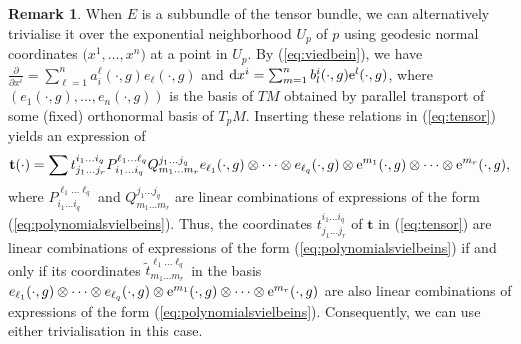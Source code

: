 \documentclass[pdftex]{sigma}
\numberwithin{equation}{section}
\theoremstyle{definition}
\newtheorem{rk}[thm]{Remark}
\begin{document}
\begin{rk} \label{lem:subbundlemetric}	When $E$ is a subbundle of the tensor bundle, we can alternatively trivialise it over the exponential neighborhood $U_p$ of $p$ using geodesic normal coordinates $\bigl(x^1, \dots, x^n\bigr)$ at a point in $U_p$.
By (\ref{eq:viedbein}), we have $\frac{ \partial}{\partial x^i}=\sum_{\ell=1}^n a_i^\ell (\cdot, g) e_\ell(\cdot,g)$ and ${\rm d}x^i=\sum_{m=1}^n b_l^i(\cdot, g) {\rm e}^l(\cdot,g) $, where $( e_1(\cdot, g), \dots, e_n(\cdot, g))$ is the basis of $TM$ obtained by parallel transport of some (fixed) orthonormal basis of $ T_pM$. Inserting these relations in
(\ref{eq:tensor}) yields an expression of
\[
\mathbf t(\cdot)=\sum t_{j_1\dots j_r}^{i_1 \dots i_q} P_{i_1\dots i_q }^{\ell_1\dots \ell_q} Q^{j_1\dots j_q }_{m_1\dots m_r} e_{\ell_1}(\cdot, g)\otimes\dots\otimes e_{\ell_q}(\cdot, g)\otimes {\rm e}^{m_1}(\cdot, g)\otimes \dots \otimes {\rm e}^{m_r}(\cdot, g),
\]
where $P_{i_1\dots i_q }^{\ell_1\dots \ell_q}$ and $Q^{j_1\dots j_q }_{m_1\dots m_r} $ are linear combinations of expressions of the form (\ref{eq:polynomialsvielbeins}). Thus, the coordinates $ t_{j_1\dots j_r}^{i_1 \dots i_q} $ of ${\mathbf t}$ in
(\ref{eq:tensor}) are linear combinations of expressions of the form (\ref{eq:polynomialsvielbeins}) if and only if its coordinates $ \tilde t_{m_1\dots m_r}^{\ell_1 \dots \ell_q} $ in the basis $ e_{\ell_1}(\cdot, g)\otimes\dots\otimes e_{\ell_q}(\cdot, g)\otimes {\rm e}^{m_1}(\cdot, g)\otimes \dots \otimes {\rm e}^{m_r}(\cdot, g)$ are also linear combinations of expressions of the form (\ref{eq:polynomialsvielbeins}).
Consequently, we can use either trivialisation in this case.
\end{rk}
\end{document}
